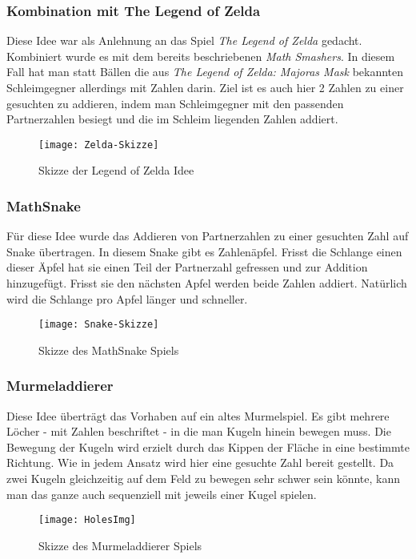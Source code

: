 \subsubsection{Kombination mit The Legend of Zelda}
Diese Idee war als Anlehnung an das Spiel \textit{The Legend of Zelda} gedacht. Kombiniert wurde es mit dem bereits beschriebenen \textit{Math Smashers}. In diesem Fall hat man statt Bällen die aus \textit{The Legend of Zelda: Majoras Mask} bekannten Schleimgegner allerdings mit Zahlen darin. Ziel ist es auch hier 2 Zahlen zu einer gesuchten zu addieren, indem man Schleimgegner mit den passenden Partnerzahlen besiegt und die im Schleim liegenden Zahlen addiert.
\begin{figure}[htb]
	\centering
	\texttt{[image: Zelda-Skizze]}
	\caption{Skizze der Legend of Zelda Idee\label{fig:zelda}}
\end{figure}
\subsubsection{MathSnake}
Für diese Idee wurde das Addieren von Partnerzahlen zu einer gesuchten Zahl auf Snake übertragen. In diesem Snake gibt es Zahlenäpfel. Frisst die Schlange einen dieser Äpfel hat sie einen Teil der Partnerzahl gefressen und zur Addition hinzugefügt. Frisst sie den nächsten Apfel werden beide Zahlen addiert. Natürlich wird die Schlange pro Apfel länger und schneller.
\begin{figure}[htb]
	\centering
	\texttt{[image: Snake-Skizze]}
	\caption{Skizze des MathSnake Spiels\label{fig:mathsnake}}
\end{figure}
\newpage
\subsubsection{Murmeladdierer}
Diese Idee überträgt das Vorhaben auf ein altes Murmelspiel. Es gibt mehrere Löcher - mit Zahlen beschriftet - in die man Kugeln hinein bewegen muss. Die Bewegung der Kugeln wird erzielt durch das Kippen der Fläche in eine bestimmte Richtung. Wie in jedem Ansatz wird hier eine gesuchte Zahl bereit gestellt. Da zwei Kugeln gleichzeitig auf dem Feld zu bewegen sehr schwer sein könnte, kann man das ganze auch sequenziell mit jeweils einer Kugel spielen.
\begin{figure}[htb]
	\centering
	\texttt{[image: HolesImg]}
	\caption{Skizze des Murmeladdierer Spiels\label{fig:murmadd}}
\end{figure}
